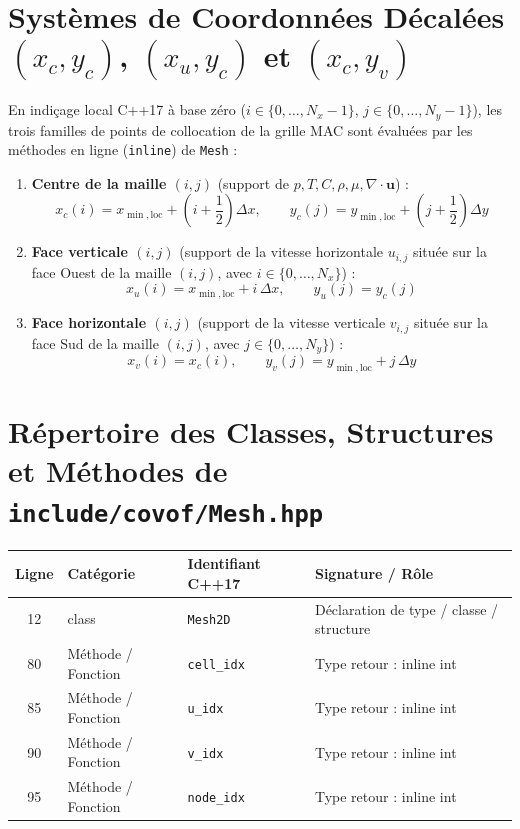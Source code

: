 \documentclass[10pt,a4paper,oneside]{book}
\begin{document}
\section{Systèmes de Coordonnées Décalées $(x_c, y_c)$, $(x_u, y_c)$ et $(x_c, y_v)$}
En indiçage local C++17 à base zéro ($i \in \{0, \dots, N_x-1\}$, $j \in \{0, \dots, N_y-1\}$), les trois familles de points de collocation de la grille MAC sont évaluées par les méthodes en ligne (\texttt{inline}) de \texttt{Mesh} :
\begin{enumerate}
  \item \textbf{Centre de la maille $(i, j)$} (support de $p, T, C, \rho, \mu, \nabla\cdot\mathbf{u}$) :
  \begin{equation}
    x_c(i) = x_{\min,\text{loc}} + \left(i + \frac{1}{2}\right)\Delta x, \qquad y_c(j) = y_{\min,\text{loc}} + \left(j + \frac{1}{2}\right)\Delta y
  \end{equation}
  \item \textbf{Face verticale $(i, j)$} (support de la vitesse horizontale $u_{i,j}$ située sur la face Ouest de la maille $(i,j)$, avec $i \in \{0, \dots, N_x\}$) :
  \begin{equation}
    x_u(i) = x_{\min,\text{loc}} + i\,\Delta x, \qquad y_u(j) = y_c(j)
  \end{equation}
  \item \textbf{Face horizontale $(i, j)$} (support de la vitesse verticale $v_{i,j}$ située sur la face Sud de la maille $(i,j)$, avec $j \in \{0, \dots, N_y\}$) :
  \begin{equation}
    x_v(i) = x_c(i), \qquad y_v(j) = y_{\min,\text{loc}} + j\,\Delta y
  \end{equation}
\end{enumerate}

\section{Répertoire des Classes, Structures et Méthodes de \texttt{include/covof/Mesh.hpp}}
\begin{center}\small
\begin{tabular}{clll}
\toprule
\textbf{Ligne} & \textbf{Catégorie} & \textbf{Identifiant C++17} & \textbf{Signature / Rôle} \\
\midrule
12 & class & \texttt{Mesh2D} & Déclaration de type / classe / structure \\
80 & Méthode / Fonction & \texttt{cell\_idx} & Type retour : inline int \\
85 & Méthode / Fonction & \texttt{u\_idx} & Type retour : inline int \\
90 & Méthode / Fonction & \texttt{v\_idx} & Type retour : inline int \\
95 & Méthode / Fonction & \texttt{node\_idx} & Type retour : inline int \\
\bottomrule
\end{tabular}
\end{center}
\end{document}
